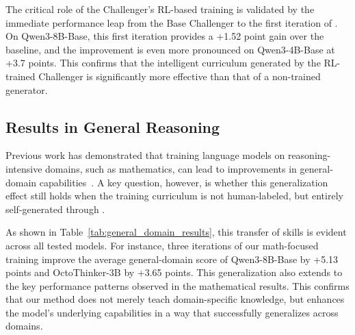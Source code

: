 The critical role of the Challenger's RL-based training is validated by the immediate performance leap from the Base Challenger to the first iteration of \method{}. On Qwen3-8B-Base, this first iteration provides a +1.52 point gain over the baseline, and the improvement is even more pronounced on Qwen3-4B-Base at +3.7 points. This confirms that the intelligent curriculum generated by the RL-trained Challenger is significantly more effective than that of a non-trained generator.

\subsection{Results in General Reasoning}

Previous work has demonstrated that training language models on  reasoning-intensive domains, such as mathematics, can lead to improvements in general-domain capabilities~\citep{Huan2025DoesMR}. A key question, however, is whether this generalization effect still holds when the training curriculum is not human-labeled, but entirely self-generated through \method{}. 



As shown in Table~\ref{tab:general_domain_results}, this transfer of skills is evident across all tested models. For instance, three iterations of our math-focused training improve the average general-domain score of Qwen3-8B-Base by +5.13 points and OctoThinker-3B by +3.65 points. This generalization also extends to the key performance patterns observed in the mathematical results. This confirms that our method does not merely teach domain-specific knowledge, but enhances the model's underlying capabilities in a way that successfully generalizes across domains.
